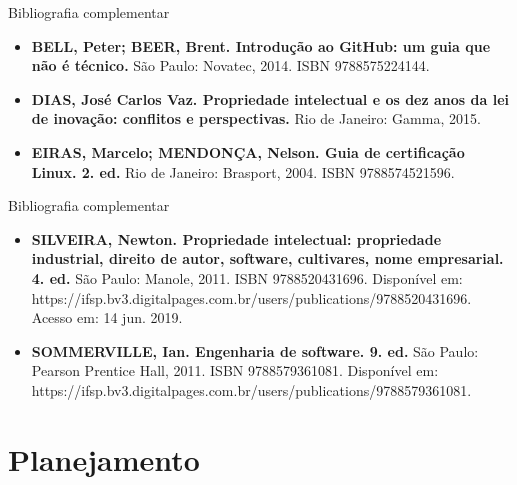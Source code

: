 \documentclass{beamer}
\begin{document}
\begin{frame}{Bibliografia complementar}
      \begin{itemize}
            \item \textbf{BELL, Peter; BEER, Brent. \textcolor{sintefdarkgreen}{Introdução ao GitHub: um guia que não é técnico.}} São Paulo: Novatec, 2014. ISBN 9788575224144.
            \item \textbf{DIAS, José Carlos Vaz. \textcolor{sintefdarkgreen}{Propriedade intelectual e os dez anos da lei de inovação:
            conflitos e perspectivas.}} Rio de Janeiro: Gamma, 2015.
            \item \textbf{EIRAS, Marcelo; MENDONÇA, Nelson. \textcolor{sintefdarkgreen}{Guia de certificação Linux. 2. ed.}} Rio de Janeiro:
            Brasport, 2004. ISBN 9788574521596.
      \end{itemize}
\end{frame}

\begin{frame}{Bibliografia complementar}
      \begin{itemize}
            \item \textbf{SILVEIRA, Newton. \textcolor{sintefdarkgreen}{Propriedade intelectual: propriedade industrial, direito de autor,
            software, cultivares, nome empresarial. 4. ed.}} São Paulo: Manole, 2011. ISBN
            9788520431696. Disponível em:
            https://ifsp.bv3.digitalpages.com.br/users/publications/9788520431696. Acesso em: 14 jun.
            2019.
            \item \textbf{
            SOMMERVILLE, Ian. \textcolor{sintefdarkgreen}{Engenharia de software. 9. ed.}} São Paulo: Pearson Prentice Hall,
            2011. ISBN 9788579361081. Disponível em:
            https://ifsp.bv3.digitalpages.com.br/users/publications/9788579361081.

      \end{itemize}
\end{frame}

\section{Planejamento}
\end{document}
